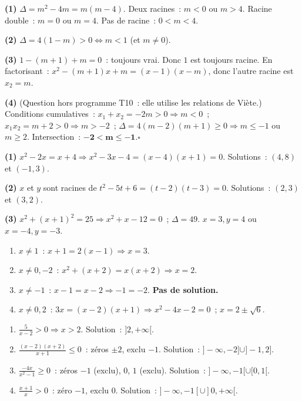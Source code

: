 
\textbf{(1)} $\Delta=m^2-4m=m(m-4)$.
Deux racines~: $m<0$ ou $m>4$.
Racine double~: $m=0$ ou $m=4$.
Pas de racine~: $0<m<4$.

\textbf{(2)} $\Delta=4(1-m)>0\Leftrightarrow m<1$ (et $m\ne0$).

\textbf{(3)} $1-(m+1)+m=0$~: toujours vrai. Donc $1$ est toujours racine.
En factorisant~: $x^2-(m+1)x+m=(x-1)(x-m)$, donc l'autre racine est $x_2=m$.

\textbf{(4)} (Question hors programme T10~: elle utilise les relations de Vi\`ete.)
Conditions cumulatives~:
$x_1+x_2=-2m>0\Rightarrow m<0$~;
$x_1x_2=m+2>0\Rightarrow m>-2$~;
$\Delta=4(m-2)(m+1)\geq0\Rightarrow m\leq-1$ ou $m\geq2$.
Intersection~: $\mathbf{-2<m\leq-1}$.\hfill$\square$


\textbf{(1)} $x^2-2x=x+4\Rightarrow x^2-3x-4=(x-4)(x+1)=0$.
Solutions~: $(4,8)$ et $(-1,3)$.

\textbf{(2)} $x$ et $y$ sont racines de $t^2-5t+6=(t-2)(t-3)=0$.
Solutions~: $(2,3)$ et $(3,2)$.

\textbf{(3)} $x^2+(x+1)^2=25\Rightarrow x^2+x-12=0$~; $\Delta=49$.
$x=3,y=4$ ou $x=-4,y=-3$.


\begin{enumerate}
  \item $x\ne1$~: $x+1=2(x-1)\Rightarrow x=3$.
  \item $x\ne0,-2$~: $x^2+(x+2)=x(x+2)\Rightarrow x=2$.
  \item $x\ne-1$~: $x-1=x-2\Rightarrow-1=-2$. \textbf{Pas de solution.}
  \item $x\ne0,2$~: $3x=(x-2)(x+1)\Rightarrow x^2-4x-2=0$~; $x=2\pm\sqrt{6}$.
\end{enumerate}


\begin{enumerate}
  \item $\frac{5}{x-2}>0\Rightarrow x>2$. Solution~: $]2,+\infty[$.
  \item $\frac{(x-2)(x+2)}{x+1}\leq0$~: z\'eros $\pm2$, exclu $-1$.
        Solution~: $]-\infty,-2]\cup]-1,2]$.
  \item $\frac{-4x}{x^2-1}\geq0$~: z\'eros $-1$ (exclu), $0$, $1$ (exclu).
        Solution~: $]-\infty,-1[\cup[0,1[$.
  \item $\frac{x+1}{x}>0$~: z\'ero $-1$, exclu $0$.
        Solution~: $]-\infty,-1[\cup]0,+\infty[$.
\end{enumerate}

